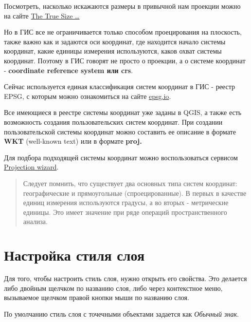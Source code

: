\documentclass[
]{book}
\begin{document}
Посмотреть, насколько искажаются размеры в привычной нам проекции можно на сайте \href{https://thetruesize.com/}{The True Size \ldots{}}

Но в ГИС все не ограничивается только способом проецирования на плоскость, также важно как и задаются оси координат, где находится начало системы координат, какие единицы измерения используются, каков охват системы координат. Поэтому в ГИС говорят не просто о проекции, а о системе координат - \textbf{coordinate reference system или crs}.

Сейчас используется единая классификация систем координат в ГИС - реестр EPSG, с которым можно ознакомиться на сайте \url{epsg.io}.

Все имеющиеся в реестре системы координат уже заданы в QGIS, а также есть возможность создания пользовательских систем координат. При создании пользовательской системы координат можно составить ее описание в формате \textbf{WKT} (well-known text) или в формате \textbf{proj.}

Для подбора подходящей системы координат можно воспользоваться сервисом \href{http://projectionwizard.org/}{Projection wizard}.

\begin{quote}
Следует помнить, что существует два основных типа систем координат: географические и прямоугольные (спроецированные). В первых в качестве единиц измерения используются градусы, а во вторых - метрические единицы. Это имеет значение при ряде операций пространственного анализа.
\end{quote}

\hypertarget{ux43dux430ux441ux442ux440ux43eux439ux43aux430-ux441ux442ux438ux43bux44f-ux441ux43bux43eux44f}{%
\section{Настройка стиля слоя}\label{ux43dux430ux441ux442ux440ux43eux439ux43aux430-ux441ux442ux438ux43bux44f-ux441ux43bux43eux44f}}

Для того, чтобы настроить стиль слоя, нужно открыть его свойства. Это делается либо двойным щелчком по названию слоя, либо через контекстное меню, вызываемое щелчком правой кнопки мыши по названию слоя.

По умолчанию стиль слоя с точечными объектами задается как \emph{Обычный знак}.
\end{document}
